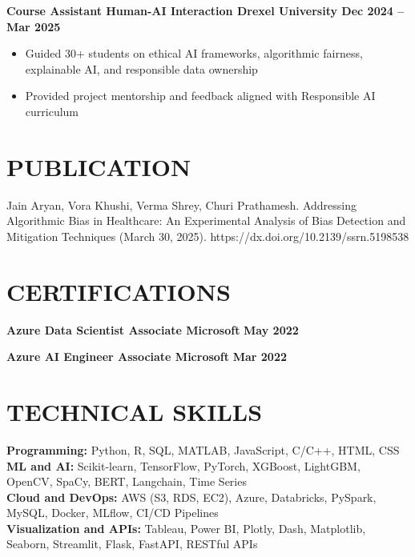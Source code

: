 \documentclass[10pt]{article}
\begin{document}
\noindent
\textbf{Course Assistant \textbar{} Human-AI Interaction \textbar{} Drexel University  \hfill Dec 2024 -- Mar 2025} \\
\vspace{-0.4cm}
\begin{itemize}[leftmargin=0.6cm, itemsep=-0.1cm, topsep=0cm]

    \item Guided 30+ students on ethical AI frameworks, algorithmic fairness, explainable AI, and responsible data ownership

    \item Provided project mentorship and feedback aligned with Responsible AI curriculum

\end{itemize}


\vspace{-0.4cm} 
\section*{PUBLICATION} 
\vspace{-0.2cm}

\noindent
\noindent Jain Aryan, Vora Khushi, Verma Shrey, Churi Prathamesh. Addressing Algorithmic Bias in Healthcare: An Experimental Analysis of Bias Detection and Mitigation Techniques (March 30, 2025). https://dx.doi.org/10.2139/ssrn.5198538


\vspace{-0.4cm} 
\section*{CERTIFICATIONS} 
\vspace{-0.2cm}

\noindent
\textbf{Azure Data Scientist Associate \textbar{} Microsoft } \hfill \textbf{May 2022 }

\noindent
\textbf{Azure AI Engineer Associate \textbar{} Microsoft } \hfill \textbf{Mar 2022 }


\vspace{-0.4cm} 
\section*{TECHNICAL SKILLS} 
\vspace{-0.2cm}
\noindent
\textbf{Programming:} Python, R, SQL, MATLAB, JavaScript, C/C++, HTML, CSS \\
\textbf{ML and AI:} Scikit-learn, TensorFlow, PyTorch, XGBoost, LightGBM, OpenCV, SpaCy, BERT, Langchain, Time Series \\
\textbf{Cloud and DevOps:} AWS (S3, RDS, EC2), Azure, Databricks, PySpark, MySQL, Docker, MLflow, CI/CD Pipelines \\
\textbf{Visualization and APIs:} Tableau, Power BI, Plotly, Dash, Matplotlib, Seaborn, Streamlit, Flask, FastAPI, RESTful APIs
\end{document}
